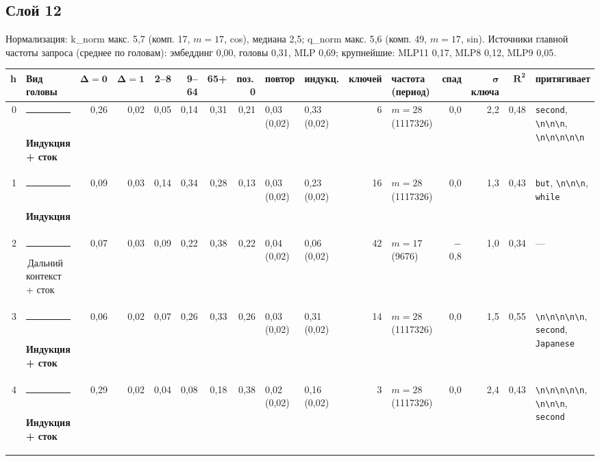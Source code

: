 \documentclass[10pt]{article}
\begin{document}
\begin{minipage}{\linewidth}
\subsection*{Слой 12}
{\small\color{ink2} Нормализация: k\_norm макс. 5,7 (комп. 17, $m{=}17$, cos), медиана 2,5; q\_norm макс. 5,6 (комп. 49, $m{=}17$, sin). Источники главной частоты запроса (среднее по головам): эмбеддинг 0,00, головы 0,31, MLP 0,69; крупнейшие: MLP11 0,17, MLP8 0,12, MLP9 0,05.}
\begin{center}{\footnotesize\begin{tabular}{|r|l|r|r|r|r|r|r|l|l|r|l|r|r|r|l|}
\hline
\rowcolor{head}\textbf{h} & \textbf{Вид головы} & $\boldsymbol{\Delta{=}0}$ & $\boldsymbol{\Delta{=}1}$ & \textbf{2–8} & \textbf{9–64} & \textbf{65+} & \textbf{поз.\,0} & \textbf{повтор} & \textbf{индукц.} & \textbf{ключей} & \textbf{частота (период)} & \textbf{спад} & $\boldsymbol{\sigma}$ \textbf{ключа} & $\boldsymbol{R^2}$ & \textbf{притягивает} \\ \hline
0 & \textcolor[HTML]{008300}{\rule{0.62em}{0.62em}}\,\textbf{Индукция + сток} & 0,26 & 0,02 & 0,05 & 0,14 & 0,31 & 0,21 & 0,03 (0,02) & 0,33 (0,02) & 6 & $m{=}28$ (1117326) & 0,0 & 2,2 & 0,48 & \texttt{\textvisiblespace{}second}, \texttt{\textvisiblespace{}\textbackslash{}n\textbackslash{}n\textbackslash{}n}, \texttt{\textbackslash{}n\textbackslash{}n\textbackslash{}n\textbackslash{}n\textbackslash{}n} \\ \hline
1 & \textcolor[HTML]{008300}{\rule{0.62em}{0.62em}}\,\textbf{Индукция} & 0,09 & 0,03 & 0,14 & 0,34 & 0,28 & 0,13 & 0,03 (0,02) & 0,23 (0,02) & 16 & $m{=}28$ (1117326) & 0,0 & 1,3 & 0,43 & \texttt{\textvisiblespace{}but}, \texttt{\textvisiblespace{}\textbackslash{}n\textbackslash{}n\textbackslash{}n}, \texttt{\textvisiblespace{}while} \\ \hline
2 & \textcolor[HTML]{C3C2B7}{\rule{0.62em}{0.62em}}\,Дальний контекст + сток & 0,07 & 0,03 & 0,09 & 0,22 & 0,38 & 0,22 & 0,04 (0,02) & 0,06 (0,02) & 42 & $m{=}17$ (9676) & $-$0,8 & 1,0 & 0,34 & — \\ \hline
3 & \textcolor[HTML]{008300}{\rule{0.62em}{0.62em}}\,\textbf{Индукция + сток} & 0,06 & 0,02 & 0,07 & 0,26 & 0,33 & 0,26 & 0,03 (0,02) & 0,31 (0,02) & 14 & $m{=}28$ (1117326) & 0,0 & 1,5 & 0,55 & \texttt{\textbackslash{}n\textbackslash{}n\textbackslash{}n\textbackslash{}n\textbackslash{}n}, \texttt{\textvisiblespace{}second}, \texttt{\textvisiblespace{}Japanese} \\ \hline
4 & \textcolor[HTML]{008300}{\rule{0.62em}{0.62em}}\,\textbf{Индукция + сток} & 0,29 & 0,02 & 0,04 & 0,08 & 0,18 & 0,38 & 0,02 (0,02) & 0,16 (0,02) & 3 & $m{=}28$ (1117326) & 0,0 & 2,4 & 0,43 & \texttt{\textbackslash{}n\textbackslash{}n\textbackslash{}n\textbackslash{}n\textbackslash{}n}, \texttt{\textvisiblespace{}\textbackslash{}n\textbackslash{}n\textbackslash{}n}, \texttt{\textvisiblespace{}second} \\ \hline

\end{tabular}}
\end{center}
\end{minipage}
\end{document}
